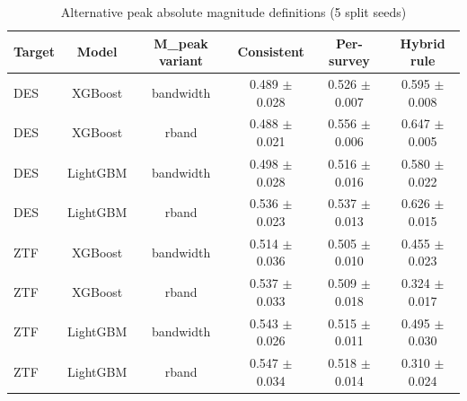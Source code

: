 \begin{table}
\centering
\caption{Alternative peak absolute magnitude definitions (5 split seeds)}
\begin{tabular}{lccccc}
\hline
Target & Model & M\_peak variant & Consistent & Per-survey & Hybrid rule \\
\hline
DES & XGBoost & bandwidth & 0.489 $\pm$ 0.028 & 0.526 $\pm$ 0.007 & 0.595 $\pm$ 0.008 \\
DES & XGBoost & rband & 0.488 $\pm$ 0.021 & 0.556 $\pm$ 0.006 & 0.647 $\pm$ 0.005 \\
DES & LightGBM & bandwidth & 0.498 $\pm$ 0.028 & 0.516 $\pm$ 0.016 & 0.580 $\pm$ 0.022 \\
DES & LightGBM & rband & 0.536 $\pm$ 0.023 & 0.537 $\pm$ 0.013 & 0.626 $\pm$ 0.015 \\
ZTF & XGBoost & bandwidth & 0.514 $\pm$ 0.036 & 0.505 $\pm$ 0.010 & 0.455 $\pm$ 0.023 \\
ZTF & XGBoost & rband & 0.537 $\pm$ 0.033 & 0.509 $\pm$ 0.018 & 0.324 $\pm$ 0.017 \\
ZTF & LightGBM & bandwidth & 0.543 $\pm$ 0.026 & 0.515 $\pm$ 0.011 & 0.495 $\pm$ 0.030 \\
ZTF & LightGBM & rband & 0.547 $\pm$ 0.034 & 0.518 $\pm$ 0.014 & 0.310 $\pm$ 0.024 \\
\hline
\end{tabular}
\end{table}
